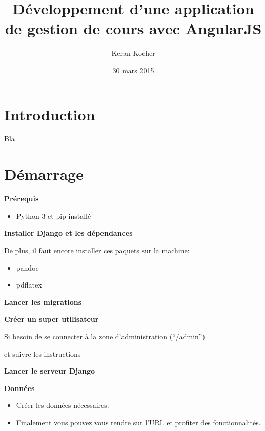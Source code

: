 \documentclass[a4paper,10pt,twoside]{sphinxmanual}
\title{Développement d'une application de gestion de cours avec AngularJS}
\date{30 mars 2015}
\author{Keran Kocher}
\begin{document}
\maketitle
\tableofcontents
{}\label{index::doc}



\chapter{Introduction}
\label{introduction:introduction}\label{introduction:developpement-d-une-application-de-gestions-de-cours-avec-angularjs}\label{introduction::doc}\setcounter{page}{3}
Bla


\chapter{Démarrage}
\label{start:demarrage}\label{start::doc}
\textbf{Prérequis}
\begin{itemize}
\item {} 
Python 3 et pip installé

\end{itemize}

\textbf{Installer Django et les dépendances}


De plus, il faut encore installer ces paquets sur la machine:
\begin{itemize}
\item {} 
pandoc

\item {} 
pdflatex

\end{itemize}

\textbf{Lancer les migrations}


\textbf{Créer un super utilisateur}

Si besoin de se connecter à la zone d'administration (``/admin'')

 et suivre les instructions

\textbf{Lancer le serveur Django}


\textbf{Données}
\begin{itemize}
\item {} 
Créer les données nécessaires: 

\item {} 
Finalement vous pouvez vous rendre sur l'URL  et profiter des fonctionnalités.

\end{itemize}
\end{document}
